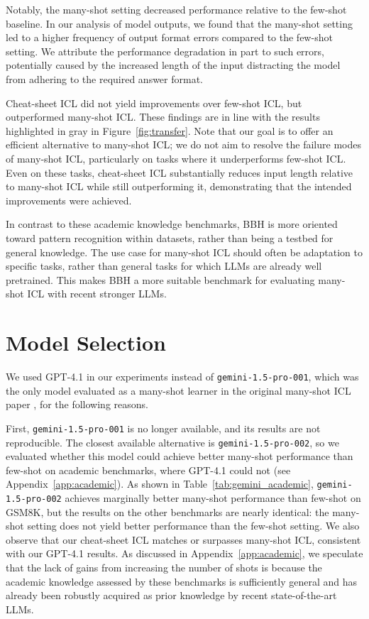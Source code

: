 \documentclass[11pt]{article}
\begin{document}
Notably, the many-shot setting decreased performance relative to the few-shot baseline.
In our analysis of model outputs, we found that the many-shot setting led to a higher frequency of output format errors compared to the few-shot setting.
We attribute the performance degradation in part to such errors, potentially caused by the increased length of the input distracting the model from adhering to the required answer format.

Cheat-sheet ICL did not yield improvements over few-shot ICL, but outperformed many-shot ICL.
These findings are in line with the results highlighted in gray in Figure~\ref{fig:transfer}.
Note that our goal is to offer an efficient alternative to many-shot ICL; we do not aim to resolve the failure modes of many-shot ICL, particularly on tasks where it underperforms few-shot ICL.
Even on these tasks, cheat-sheet ICL substantially reduces input length relative to many-shot ICL while still outperforming it, demonstrating that the intended improvements were achieved.

In contrast to these academic knowledge benchmarks, BBH is more oriented toward pattern recognition within datasets, rather than being a testbed for general knowledge.
The use case for many-shot ICL should often be adaptation to specific tasks, rather than general tasks for which LLMs are already well pretrained.
This makes BBH a more suitable benchmark for evaluating many-shot ICL with recent stronger LLMs.








\section{Model Selection}
\label{app:model_selection}
We used GPT-4.1 in our experiments instead of \texttt{gemini-1.5-pro-001}, which was the only model evaluated as a many-shot learner in the original many-shot ICL paper \citep{agarwal2024manyshot}, for the following reasons.

First, \texttt{gemini-1.5-pro-001} is no longer available, and its results are not reproducible.
The closest available alternative is \texttt{gemini-1.5-pro-002}, so we evaluated whether this model could achieve better many-shot performance than few-shot on academic benchmarks, where GPT-4.1 could not (see Appendix~\ref{app:academic}).
As shown in Table~\ref{tab:gemini_academic}, \texttt{gemini-1.5-pro-002} achieves marginally better many-shot performance than few-shot on GSM8K, but the results on the other benchmarks are nearly identical: the many-shot setting does not yield better performance than the few-shot setting.
We also observe that our cheat-sheet ICL matches or surpasses many-shot ICL, consistent with our GPT-4.1 results.
As discussed in Appendix~\ref{app:academic}, we speculate that the lack of gains from increasing the number of shots is because the academic knowledge assessed by these benchmarks is sufficiently general and has already been robustly acquired as prior knowledge by recent state-of-the-art LLMs.
\end{document}
